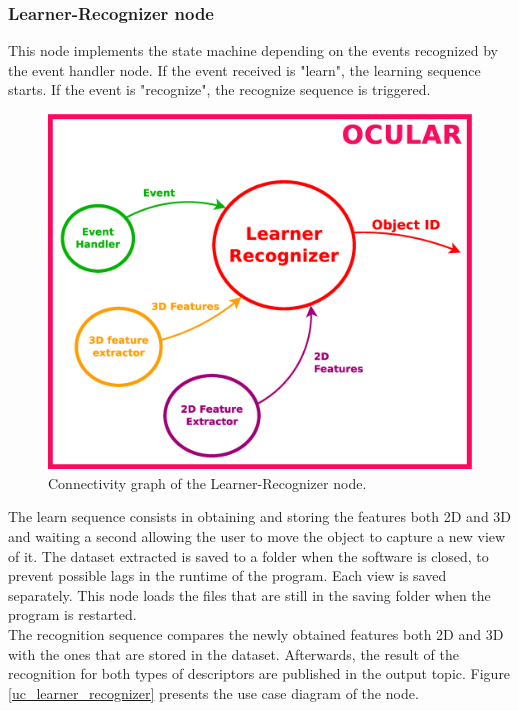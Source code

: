 
\subsubsection{Learner-Recognizer node}
\label{learner_recognizer}

	This node implements the state machine depending on the events recognized by the event handler node. If the event received is "learn", the learning sequence starts. If the event is "recognize", the recognize sequence is triggered. 
	\\

		\begin{figure}[H]
			\begin{center}
			\includegraphics[width=0.5\linewidth]{img/diagrams/node_lr.eps}
			\caption[Learner-Recognizer node I/O]{Connectivity graph of the Learner-Recognizer node.}		
			\end{center}
						\label{node_lr}

		\end{figure}

	The learn sequence consists in obtaining and storing the features both 2D and 3D and waiting a second allowing the user to move the object to capture a new view of it. 
	The dataset extracted is saved to a folder when the software is closed, to prevent possible lags in the runtime of the program. 
	Each view is saved separately. 
	This node loads the files that are still in the saving folder when the program is restarted. 
	\\

	The recognition sequence compares the newly obtained features both 2D and 3D with the ones that are stored in the dataset. 
	Afterwards, the result of the recognition for both types of descriptors are published in the output topic. 
	Figure \ref{uc_learner_recognizer} presents the use case diagram of the node. 

